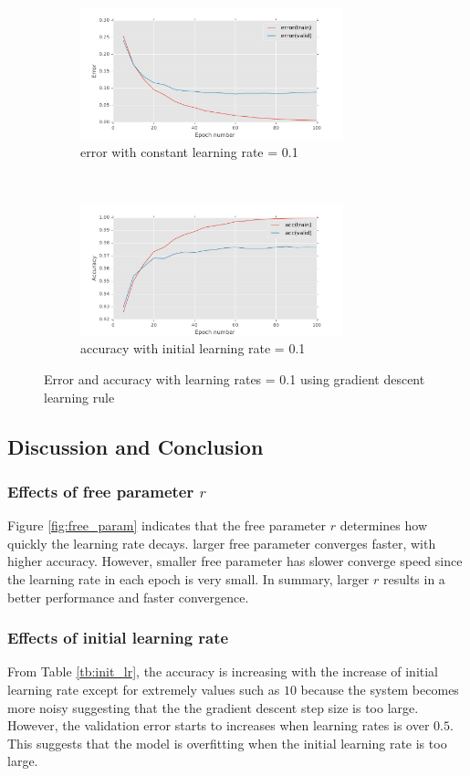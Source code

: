 \documentclass[11pt]{article}
\begin{document}
\begin{figure}[t!]
    \centering
    \begin{subfigure}[t]{0.45\textwidth}
        \centering
        \includegraphics[height=1.5in]{error_with_const_LR_0_1.pdf}
        \caption{error with constant learning rate = 0.1}
    \end{subfigure}   
    ~
    \begin{subfigure}[t]{0.45\textwidth}
        \centering
        \includegraphics[height=1.5in]{acc_with_const_LR_0_1.pdf}
        \caption{accuracy with initial learning rate = 0.1}
    \end{subfigure}    
    \caption{Error and accuracy with learning rates = 0.1 using gradient descent learning rule}    
    \label{fig:const_LR}
\end{figure}


\subsection{Discussion and Conclusion}
\subsubsection{Effects of free parameter $r$}
Figure \ref{fig:free_param} indicates that the free parameter $r$ determines how quickly the learning rate decays. larger free parameter converges faster, with higher accuracy. However, smaller free parameter has slower converge speed since the learning rate in each epoch is very small. In summary, larger $r$ results in a better performance and faster convergence.

\subsubsection{Effects of initial learning rate}
From Table \ref{tb:init_lr}, the accuracy is increasing with the increase of initial learning rate except for extremely values such as $10$ because the system becomes more noisy suggesting that the the gradient descent step size is too large. However, the validation error starts to increases when learning rates is over $0.5$. This suggests that the model is overfitting when the initial learning rate is too large. 
\end{document}
